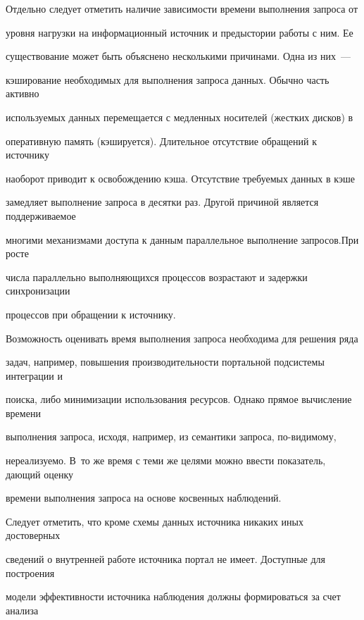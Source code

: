       Отдельно следует отметить наличие зависимости времени выполнения запроса от 


уровня нагрузки на информационный источник и предыстории работы с ним. Ее 


существование может быть объяснено несколькими причинами. Одна из них~--- 


кэширование необходимых для выполнения запроса данных. Обычно часть активно 


используемых данных перемещается с медленных носителей (жестких дисков) в 


оперативную память (кэшируется). Длительное отсутствие обращений к источнику 


наоборот приводит к освобождению кэша. Отсутствие тре\-бу\-емых данных в кэше 


замедляет выполнение запроса в десятки раз. Другой причиной является поддерживаемое 


многими механизмами доступа к данным параллельное выполнение запросов.\linebreak При росте 


числа параллельно выполняющихся процессов возрастают и задержки синхронизации 


процессов при обращении к источнику.


      


      Возможность оценивать время выполнения запроса необходима для решения ряда 


задач, например, повышения производительности портальной подсистемы интеграции и 


поиска, либо минимизации использования ресурсов. Однако прямое вычисление времени 


выполнения запроса, исходя, например, из семантики запроса, по-видимому, 


нереализуемо. В~то же время с теми же целями можно ввести показатель, дающий оценку 


времени выполнения запроса на основе косвенных наблюдений.


      


      Следует отметить, что кроме схемы данных источника никаких иных достоверных 


сведений о внутренней работе источника портал не имеет. Доступные для построения 


модели эффективности источника наблюдения должны формироваться за счет анализа 


